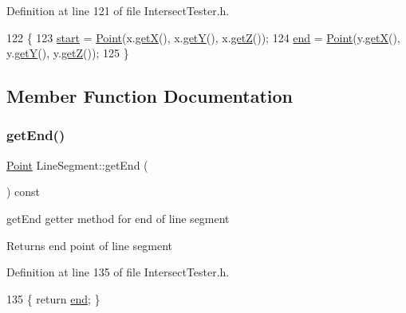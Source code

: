 Definition at line 121 of file Intersect\+Tester.\+h.


\begin{DoxyCode}
122         \{
123              \hyperlink{class_line_segment_a91bddd96ae050a8255e3180c50f071f5}{start} = \hyperlink{class_point}{Point}(x.\hyperlink{class_point_a29c44ec7c7279e02629645a06cdaf7d5}{getX}(), x.\hyperlink{class_point_a2371ffadbe245d12a8f556d0a976521b}{getY}(), x.\hyperlink{class_point_a9bb9987e32b7dd8dec81ead5d428446c}{getZ}());
124              \hyperlink{class_line_segment_acf33c308064ab9c60f47c11b5d23db06}{end} = \hyperlink{class_point}{Point}(y.\hyperlink{class_point_a29c44ec7c7279e02629645a06cdaf7d5}{getX}(), y.\hyperlink{class_point_a2371ffadbe245d12a8f556d0a976521b}{getY}(), y.\hyperlink{class_point_a9bb9987e32b7dd8dec81ead5d428446c}{getZ}());
125         \}
\end{DoxyCode}


\subsection{Member Function Documentation}
\mbox{\label{class_line_segment_a7b05f883c369b950e61009edfafbbd0e}} 
\subsubsection{\texorpdfstring{get\+End()}{getEnd()}}
{\footnotesize\ttfamily \hyperlink{class_point}{Point} Line\+Segment\+::get\+End (\begin{DoxyParamCaption}{ }\end{DoxyParamCaption}) const\hspace{0.3cm}{\ttfamily [inline]}}



get\+End getter method for end of line segment 

\begin{DoxyReturn}{Returns}
end point of line segment 
\end{DoxyReturn}


Definition at line 135 of file Intersect\+Tester.\+h.


\begin{DoxyCode}
135 \{ \textcolor{keywordflow}{return} \hyperlink{class_line_segment_acf33c308064ab9c60f47c11b5d23db06}{end}; \} 
\end{DoxyCode}
\mbox{\label{class_line_segment_afcff6bd5f6a3073a44f7b21db0be876f}} 
